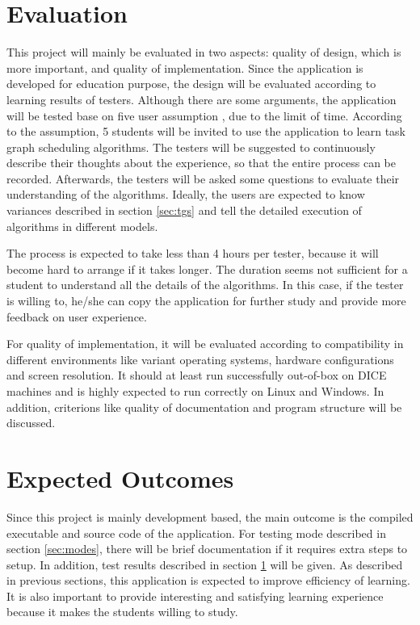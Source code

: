 \documentclass[a4paper,11pt]{article}
\begin{document}
\section{Evaluation} \label{sec:eva}

This project will mainly be evaluated in two aspects: quality of design, which is more important, and quality of implementation. Since the application is developed for education purpose, the design will be evaluated according to learning results of testers. Although there are some arguments, the application will be tested base on five user assumption \cite{Virzi1992}, due to the limit of time. According to the assumption, 5 students will be invited to use the application to learn task graph scheduling algorithms. The testers will be suggested to continuously describe their thoughts about the experience, so that the entire process can be recorded. Afterwards, the testers will be asked some questions to evaluate their understanding of the algorithms. Ideally, the users are expected to know variances described in section \ref{sec:tgs} and tell the detailed execution of algorithms in different models.

The process is expected to take less than 4 hours per tester, because it will become hard to arrange if it takes longer. The duration seems not sufficient for a student to understand all the details of the algorithms. In this case, if the tester is willing to, he/she can copy the application for further study and provide more feedback on user experience.

For quality of implementation, it will be evaluated according to compatibility in different environments like variant operating systems, hardware configurations and screen resolution. It should at least run successfully out-of-box on DICE machines and is highly expected to run correctly on Linux and Windows. In addition, criterions like quality of documentation and program structure will be discussed.

\section{Expected Outcomes}

Since this project is mainly development based, the main outcome is the compiled executable and source code of the application. For testing mode described in section \ref{sec:modes}, there will be brief documentation if it requires extra steps to setup. In addition, test results described in section \ref{sec:eva} will be given. As described in previous sections, this application is expected to improve efficiency of learning. It is also important to provide interesting and satisfying learning experience because it makes the students willing to study.
\end{document}

